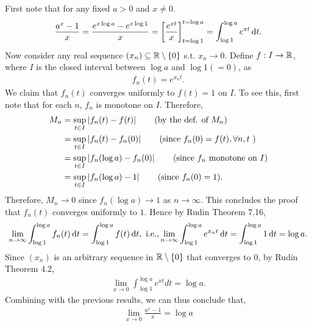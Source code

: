 \documentclass[12pt]{article}
\begin{document}
\begin{fproof}[1(a)]
 First note that for any fixed \(a > 0\) and \(x \neq 0\).
 \begin{align*}
    \frac{a^x - 1}{x} = \frac{e^{x \log a} - e^{x \log 1}}{x} = \left[ \frac{e^{xt}}{x} \right]_{t= \log 1}^{t= \log a} = \int_{\log 1}^{\log a} e^{x t} \mathop{}\!\mathrm{d} t.
 \end{align*}
 Now consider any real sequence \((x_n) \subseteq \mathbb {R} \setminus \{0\}\) s.t. \(x_n \to 0\).
 Define \(f : I \to \mathbb {R}\), where \(I\) is the closed interval between \(\log a\) and \(\log 1(=0)\), as
 \begin{align*}
    f_n(t) = e^{x_n t}.
 \end{align*}
 We claim that \(f_n(t)\) converges uniformly to \(f(t) = 1\) on \(I\).
 To see this, first note that for each \(n\), \(f_n\) is monotone on \(I\).
 Therefore,
 \begin{align*}
    M_n &= \sup_{t \in I} \left\lvert f_n(t) - f(t) \right\rvert \tag{by the def. of \(M_n\)}\\
    &= \sup_{t \in I} \left\lvert f_n(t) - f_n(0) \right\rvert \tag{since \(f_n(0) = f(t), \forall n,t\) }\\
    &= \sup_{t \in I} \left\lvert f_n(\log a) - f_n(0) \right\rvert \tag{since \(f_n\) monotone on \(I\)}\\
    &=\sup_{t \in I} \left\lvert f_n(\log a) - 1 \right\rvert \tag{since \(f_n(0) = 1\)}.
 \end{align*}
 Therefore, \(M_n \to 0\) since \(f_n(\log a) \to 1\) as \(n \to \infty\).
 This concludes the proof that \(f_n(t)\) converges uniformly to \(1\).
 Hence by Rudin Theorem 7.16,
 \begin{align*}
    \lim_{n\to \infty} \int_{\log 1}^{\log a} f_n(t) \mathop{}\!\mathrm{d} t = \int_{\log 1}^{\log a} f(t) \mathop{}\!\mathrm{d} t, \text{ i.e.,}
    \lim_{n\to \infty} \int_{\log 1}^{\log a} e^{x_n t} \mathop{}\!\mathrm{d} t = \int_{\log 1}^{\log a} 1 \mathop{}\!\mathrm{d} t = \log a.
 \end{align*}
Since \((x_n)\) is an arbitrary sequence in \(\mathbb {R} \setminus \{0\}\) that converges to \(0\), by Rudin Theorem 4.2,
\begin{align*}
    \lim_{x \to 0} \int_{\log 1}^{\log a} e^{xt} 
    dt = \log a.
\end{align*}
Combining with the previous results, we can thus conclude that,
\begin{align*}
    \lim_{x \to 0} \frac{a^x - 1}{x} = \log a
\end{align*}
\end{fproof}
\end{document}

